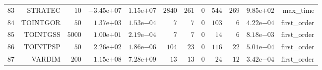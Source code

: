 \begin{longtable}{rrrrrrrrrrrr}
  \(    83\) & STRATEC & \(    10\) & \(-3.45\)e\(+07\) & \( 1.15\)e\(+07\) & \(  2840\) & \(   261\) & \(     0\) & \(   544\) & \(   269\) & \( 9.85\)e\(+02\) & max\_time \\
  \(    84\) & TOINTGOR & \(    50\) & \( 1.37\)e\(+03\) & \( 1.53\)e\(-04\) & \(     7\) & \(     7\) & \(     0\) & \(   103\) & \(     6\) & \( 4.22\)e\(-04\) & first\_order \\
  \(    85\) & TOINTGSS & \(  5000\) & \( 1.00\)e\(+01\) & \( 2.19\)e\(-04\) & \(     7\) & \(     7\) & \(     0\) & \(    14\) & \(     6\) & \( 8.18\)e\(-03\) & first\_order \\
  \(    86\) & TOINTPSP & \(    50\) & \( 2.26\)e\(+02\) & \( 1.86\)e\(-06\) & \(   104\) & \(    23\) & \(     0\) & \(   116\) & \(    22\) & \( 5.01\)e\(-04\) & first\_order \\
  \(    87\) & VARDIM & \(   200\) & \( 1.15\)e\(+08\) & \( 7.28\)e\(+09\) & \(    13\) & \(    13\) & \(     0\) & \(    24\) & \(    12\) & \( 3.42\)e\(-04\) & first\_order \\\hline
\end{longtable}
